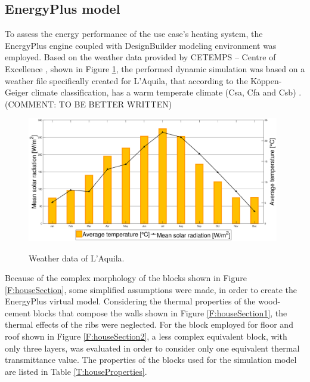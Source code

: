\subsection{EnergyPlus model}\label{SS:energyPlusmodel}
To assess the energy performance of the use case's heating system, the EnergyPlus engine coupled with DesignBuilder modeling environment was employed. Based on the weather data provided by CETEMPS – Centre of Excellence \cite{CETEMPS}, shown in Figure \ref{F:houseExternalWeather}, the performed dynamic simulation was based on a weather file specifically created for L'Aquila, that according to the K\"{o}ppen-Geiger climate classification, has a warm temperate climate (Csa, Cfa and Csb) \cite{Peel2007}. (COMMENT: TO BE BETTER WRITTEN)

\begin{figure}[h!]
	\begin{center}
		\includegraphics[width=26pc]{figures/dati_climatici_rev01.eps}
		\caption{Weather data of L'Aquila.}
		\captionsetup{justification=centering}
		\label{F:houseExternalWeather}
	\end{center}
\end{figure}

Because of the complex morphology of the blocks shown in Figure \ref{F:houseSection}, some simplified assumptions were made, in order to create the EnergyPlus virtual model. Considering the thermal properties of the wood-cement blocks that compose the walls shown in Figure \ref{F:houseSection1}, the thermal effects of the ribs were neglected. For the block employed for floor and roof shown in Figure \ref{F:houseSection2}, a less complex equivalent block, with only three layers, was evaluated in order to consider only one equivalent thermal transmittance value. The properties of the blocks used for the simulation model are listed in Table \ref{T:houseProperties}.    


